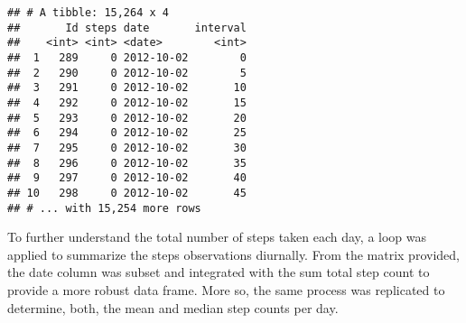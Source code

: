 \documentclass[]{article}
\newenvironment{Shaded}{\begin{snugshade}}{\end{snugshade}}
\newcommand{\KeywordTok}[1]{\textcolor[rgb]{0.13,0.29,0.53}{\textbf{#1}}}
\newcommand{\DataTypeTok}[1]{\textcolor[rgb]{0.13,0.29,0.53}{#1}}
\newcommand{\DecValTok}[1]{\textcolor[rgb]{0.00,0.00,0.81}{#1}}
\newcommand{\StringTok}[1]{\textcolor[rgb]{0.31,0.60,0.02}{#1}}
\newcommand{\OperatorTok}[1]{\textcolor[rgb]{0.81,0.36,0.00}{\textbf{#1}}}
\newcommand{\NormalTok}[1]{#1}
\begin{document}
\begin{Shaded}
\end{Shaded}

\begin{verbatim}
## # A tibble: 15,264 x 4
##       Id steps date       interval
##    <int> <int> <date>        <int>
##  1   289     0 2012-10-02        0
##  2   290     0 2012-10-02        5
##  3   291     0 2012-10-02       10
##  4   292     0 2012-10-02       15
##  5   293     0 2012-10-02       20
##  6   294     0 2012-10-02       25
##  7   295     0 2012-10-02       30
##  8   296     0 2012-10-02       35
##  9   297     0 2012-10-02       40
## 10   298     0 2012-10-02       45
## # ... with 15,254 more rows
\end{verbatim}

To further understand the total number of steps taken each day, a loop
was applied to summarize the steps observations diurnally. From the
matrix provided, the date column was subset and integrated with the sum
total step count to provide a more robust data frame. More so, the same
process was replicated to determine, both, the mean and median step
counts per day.

\begin{Shaded}
\end{Shaded}
\end{document}
